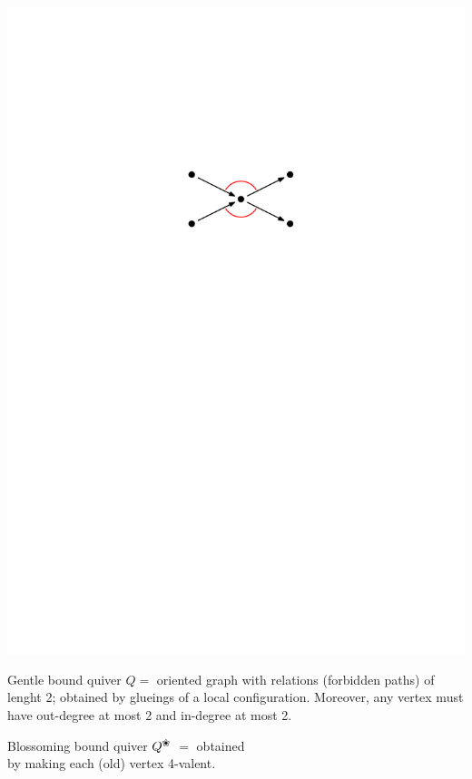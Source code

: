 \documentclass[portrait,final,a0paper,fontscale=0.25]{baposter}
\newcommand{\blossom}{^\text{\ding{96}}} %
\theoremstyle{definition}
\begin{document}
\begin{poster}
{\hspace*{7.5cm}\includegraphics[scale=.35]{GentleCondition}

\vspace*{-1cm}
\begin{minipage}{7.2cm}
{\color{green} Gentle bound quiver} $Q =$ oriented graph with relations (forbidden paths) of lenght 2; obtained by glueings of a local configuration.
Moreover, any vertex must have out-degree at most 2 and in-degree at most 2.

\vspace{.2cm}
{\color{green} Blossoming bound quiver} $Q\blossom$ $=$ obtained \\ by making each (old) vertex 4-valent.
\end{minipage}

}
\end{poster}
\end{document}
